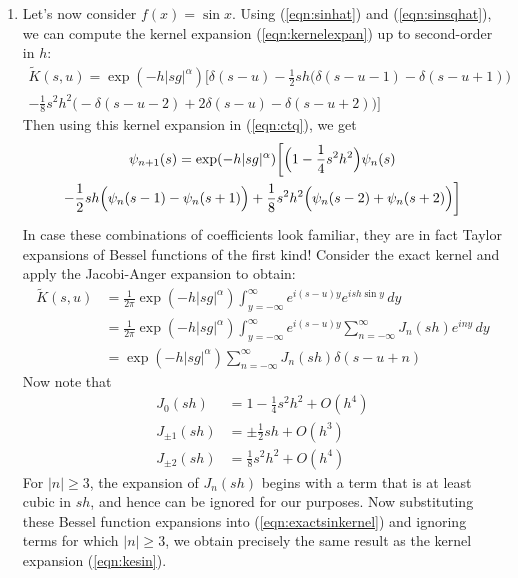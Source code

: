 \documentclass[12pt]{l4dc2021}
\begin{document}
\begin{enumerate}
\item Let's now consider $f(x) = \sin x$.  Using (\ref{eqn:sinhat}) and (\ref{eqn:sinsqhat}), we can compute the kernel expansion  (\ref{eqn:kernelexpan}) up to second-order in $h$:
\begin{multline}
\label{eqn:kesin}
\widetilde{K}(s,u) = \exp(-h |s g|^{\alpha})  \biggl[ \delta(s-u) - \frac{1}{2} s h \bigl( \delta(s-u-1) - \delta(s-u+1) \bigr) \\ - \frac{1}{8} s^2 h^2 \bigl( -\delta(s-u-2) + 2 \delta(s-u) - \delta(s-u+2) \bigr) \biggr]
\end{multline}
Then using this kernel expansion in (\ref{eqn:ctq}), we get
\begin{multline*}
\psi_{n+1}(s) = \exp(-h |s g|^{\alpha}) \biggl[
\Bigl( 1 - \frac{1}{4} s^2 h^2 \Bigr) \psi_n(s) \\
- \frac{1}{2} s h \Bigl( \psi_n(s-1) - \psi_n(s + 1) \Bigr)
+ \frac{1}{8} s^2 h^2 \Bigl( \psi_n(s-2) + \psi_n(s + 2) \Bigr) \biggr]
\end{multline*}
In case these combinations of coefficients look familiar, they are in fact Taylor expansions of Bessel functions of the first kind!  Consider the exact kernel and apply the Jacobi-Anger expansion to obtain:
\begin{align}
\widetilde{K}(s,u) &= \frac{1}{2 \pi}  \exp(-h |s g|^{\alpha})  \int_{y=-\infty}^\infty e^{i(s-u)y} e^{i s h \sin y } \, dy \nonumber \\
 &= \frac{1}{2 \pi}  \exp(-h |s g|^{\alpha})  \int_{y=-\infty}^\infty e^{i(s-u)y} \sum_{n=-\infty}^\infty J_n(s h) e^{i n  y} \, dy \nonumber \\
 \label{eqn:exactsinkernel}
 &=  \exp(-h |s g|^{\alpha}) \sum_{n=-\infty}^\infty J_n(s h) \delta(s - u + n) 
\end{align}
Now note that
\begin{align*}
J_0 (sh) &= 1 - \frac{1}{4} s^2 h^2 + O(h^4) \\
J_{\pm 1} (sh) &= \pm \frac{1}{2} s h + O(h^3) \\
J_{\pm 2} (sh) &= \frac{1}{8} s^2 h^2 + O(h^4)
\end{align*}
For $|n| \geq 3$, the expansion of $J_{n}(s h)$ begins with a term that is at least cubic in $s h$, and hence can be ignored for our purposes.  Now substituting these Bessel function expansions into (\ref{eqn:exactsinkernel}) and ignoring terms for which $|n| \geq 3$, we obtain precisely the same result as the kernel expansion (\ref{eqn:kesin}).
\end{enumerate}



% 
\end{document}
